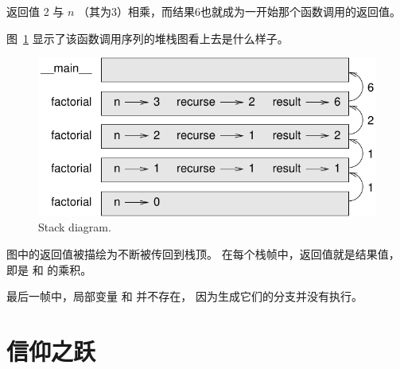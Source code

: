 
返回值 2 与 $n$ （其为3）相乘，而结果6也就成为一开始那个函数调用的返回值。


图~\ref{fig.stack3} 显示了该函数调用序列的堆栈图看上去是什么样子。

\begin{figure}
\centerline
{\includegraphics[scale=0.8]{../source/figs/stack3.pdf}}
\caption{Stack diagram.}
\label{fig.stack3}
\end{figure}


图中的返回值被描绘为不断被传回到栈顶。 在每个栈帧中，返回值就是结果值，即是  和  的乘积。
  


最后一帧中，局部变量  和  并不存在， 因为生成它们的分支并没有执行。


\section{信仰之跃}
  

